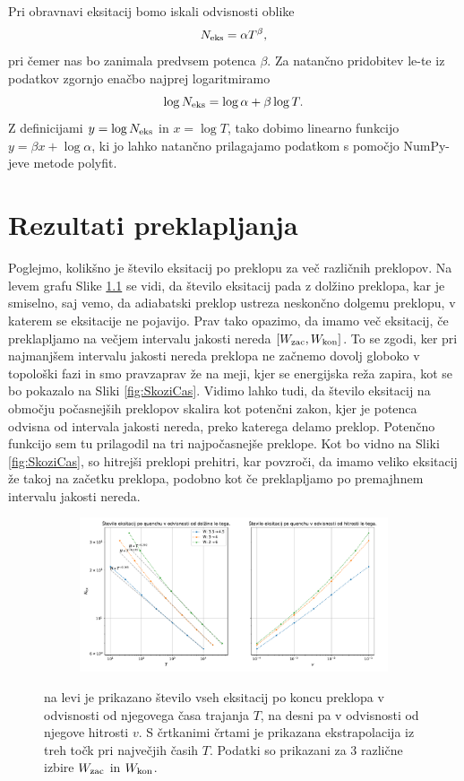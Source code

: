 Pri obravnavi eksitacij bomo iskali odvisnosti oblike 
\begin{equation}
N_{\textup{eks}} = \alpha T^{\beta},
\end{equation}
pri čemer nas bo zanimala predvsem potenca $\beta$. Za natančno pridobitev le-te iz podatkov zgornjo enačbo najprej logaritmiramo
\begin{equation}
\log N_{\textup{eks}} = \log \alpha + \beta \log T.
\end{equation}
Z definicijami $y=\log N_{\textup{eks}}$ in $x=\log T$, tako dobimo linearno funkcijo $y=\beta x + \log \alpha$, ki jo lahko natančno prilagajamo podatkom s pomočjo NumPy-jeve metode polyfit.

\chapter{Rezultati preklapljanja}
Poglejmo, kolikšno je število eksitacij po preklopu za več različnih preklopov. Na levem grafu Slike \ref{fig:Skaliranje} se vidi, da število eksitacij pada z dolžino preklopa, kar je smiselno, saj vemo, da adiabatski preklop ustreza neskončno dolgemu preklopu, v katerem se eksitacije ne pojavijo.
Prav tako opazimo, da imamo več eksitacij, če preklapljamo na večjem intervalu jakosti nereda $[W_{\textup{zac}}, W_{\textup{kon}}]$. To se zgodi, ker pri najmanjšem intervalu jakosti nereda preklopa ne začnemo dovolj globoko v topološki fazi in smo pravzaprav že na meji, kjer se energijska reža zapira, kot se bo pokazalo na Sliki \ref{fig:SkoziCas}. Vidimo lahko tudi, da število eksitacij na območju počasnejših preklopov skalira kot potenčni zakon, kjer je potenca odvisna od intervala jakosti nereda, preko katerega delamo preklop. Potenčno funkcijo sem tu prilagodil na tri najpočasnejše preklope. Kot bo vidno na Sliki \ref{fig:SkoziCas}, so hitrejši preklopi prehitri, kar povzroči, da imamo veliko eksitacij že takoj na začetku preklopa, podobno kot če preklapljamo po premajhnem intervalu jakosti nereda.
\begin{figure}[H]
\centering
\begin{subfigure}{.99\textwidth}
\includegraphics[trim=0 0 0 24,clip,width=\linewidth]{Figures/Skaliranje3Alt.pdf}
\end{subfigure}
\caption{na levi je prikazano število vseh eksitacij po koncu preklopa v odvisnosti od njegovega časa trajanja $T$, na desni pa v odvisnosti od njegove hitrosti $v$. S črtkanimi črtami je prikazana ekstrapolacija iz treh točk pri največjih časih $T$. Podatki so prikazani za 3 različne izbire $W_{\textup{zac}}$ in $W_{\textup{kon}}$.}
\label{fig:Skaliranje}
\end{figure}
